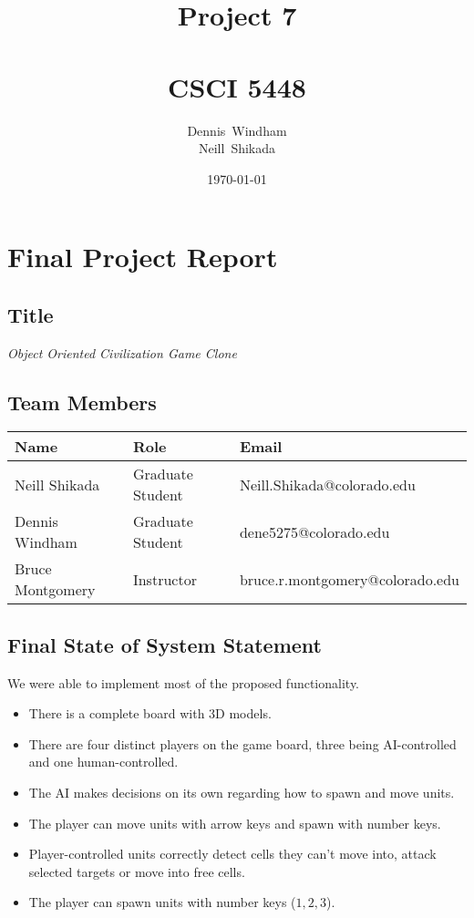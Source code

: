 \documentclass[11pt]{amsart}
\def \fnamea{Dennis}
\def \fnameb{Neill}
\def \lnamea{Windham}
\def \lnameb{Shikada}
\def \class{CSCI 5448}
\def \hwnum{7} %
\def \assgn{Project \hwnum}
\begin{document}
\author[\lnamea]{\fnamea\ \lnamea\\\fnameb\ \lnameb}
\date{\today}
\title[\assgn]{\assgn \\ \ \\\class}
\maketitle
\tableofcontents

\newpage
\section*{\textbf{Final Project Report}}
\subsection*{Title}
\begin{center}
    \textit{Object Oriented Civilization Game Clone}
\end{center}

\subsection*{Team Members} \phantom{}

\begin{table}[htbp]
    \begin{tabularx}{\textwidth}{l|l|l}
        \textbf{Name}    & \textbf{Role}    & \textbf{Email}                  \\
        \hline
        Neill Shikada    & Graduate Student & Neill.Shikada@colorado.edu
        \\
        Dennis Windham   & Graduate Student & dene5275@colorado.edu           \\
        Bruce Montgomery & Instructor       & bruce.r.montgomery@colorado.edu
    \end{tabularx}
\end{table}

\subsection*{Final State of System Statement}
We were able to implement most of the proposed functionality.
\begin{itemize}
    \item There is a complete board with 3D models.
    \item There are four distinct players on the game board, three being AI-controlled and one human-controlled.
    \item The AI makes decisions on its own regarding how to spawn and move units.
    \item The player can move units with arrow keys and spawn with number keys.
    \item Player-controlled units correctly detect cells they can't move into, attack selected targets or move into free cells.
    \item The player can spawn units with number keys ($1,2,3$).
\end{itemize}
\end{document}
